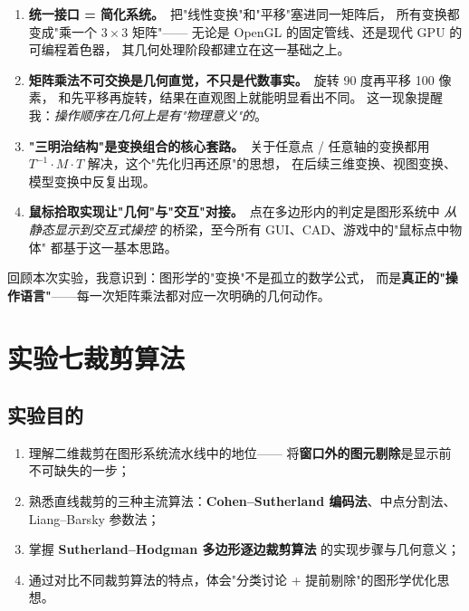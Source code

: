 \documentclass[a4paper,12pt]{ctexart}
\begin{document}
\begin{enumerate}[leftmargin=2em,itemsep=0.2em]
    \item \textbf{统一接口 = 简化系统。}\ 把"线性变换"和"平移"塞进同一矩阵后，
        所有变换都变成"乘一个 $3\times 3$ 矩阵"——
        无论是 OpenGL 的固定管线、还是现代 GPU 的可编程着色器，
        其几何处理阶段都建立在这一基础之上。

    \item \textbf{矩阵乘法不可交换是几何直觉，不只是代数事实。}\ 旋转 90 度再平移 100 像素，
        和先平移再旋转，结果在直观图上就能明显看出不同。
        这一现象提醒我：\emph{操作顺序在几何上是有"物理意义"的}。

    \item \textbf{"三明治结构"是变换组合的核心套路。}\ 关于任意点 / 任意轴的变换都用
        $T^{-1}\cdot M\cdot T$ 解决，这个"先化归再还原"的思想，
        在后续三维变换、视图变换、模型变换中反复出现。

    \item \textbf{鼠标拾取实现让"几何"与"交互"对接。}\ 点在多边形内的判定是图形系统中
        \emph{从静态显示到交互式操控} 的桥梁，至今所有 GUI、CAD、游戏中的"鼠标点中物体"
        都基于这一基本思路。
\end{enumerate}

回顾本次实验，我意识到：图形学的"变换"不是孤立的数学公式，
而是\textbf{真正的"操作语言"}——每一次矩阵乘法都对应一次明确的几何动作。

\clearpage
\section{实验七\quad 裁剪算法}

\subsection{实验目的}

\begin{enumerate}[leftmargin=2em,itemsep=0.2em]
    \item 理解二维裁剪在图形系统流水线中的地位——
        将\textbf{窗口外的图元剔除}是显示前不可缺失的一步；
    \item 熟悉直线裁剪的三种主流算法：\textbf{Cohen–Sutherland 编码法}、中点分割法、Liang–Barsky 参数法；
    \item 掌握 \textbf{Sutherland–Hodgman 多边形逐边裁剪算法} 的实现步骤与几何意义；
    \item 通过对比不同裁剪算法的特点，体会"分类讨论 + 提前剔除"的图形学优化思想。
\end{enumerate}
\end{document}

